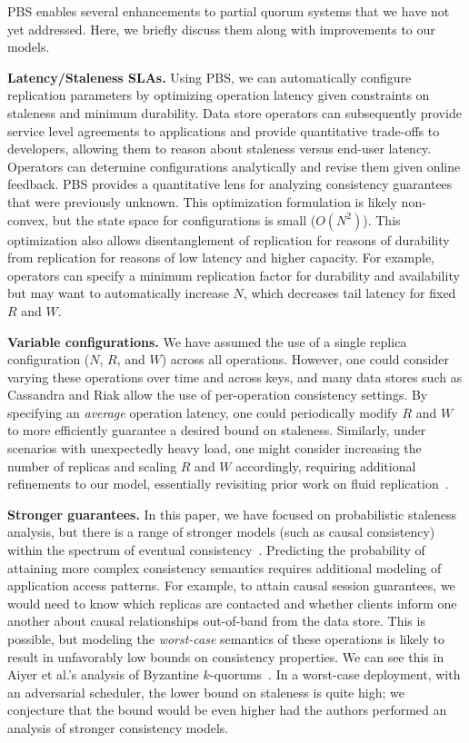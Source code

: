 \documentclass{vldb}
\begin{document}
PBS enables several enhancements to partial quorum systems that we
have not yet addressed.  Here, we briefly discuss them along with
improvements to our models.

\textbf{Latency/Staleness SLAs.} Using PBS, we can automatically
configure replication parameters by optimizing operation latency given
constraints on staleness and minimum durability.  Data store operators
can subsequently provide service level agreements to applications and
provide quantitative trade-offs to developers, allowing them to reason
about staleness versus end-user latency.  Operators can determine
configurations analytically and revise them given online feedback.
PBS provides a quantitative lens for analyzing consistency guarantees
that were previously unknown.  This optimization formulation is likely
non-convex, but the state space for configurations is small
($O(N^2)$).  This optimization also allows disentanglement of
replication for reasons of durability from replication for reasons of
low latency and higher capacity.  For example, operators can specify a
minimum replication factor for durability and availability but may
want to automatically increase $N$, which decreases tail latency for
fixed $R$ and $W$.

\textbf{Variable configurations.} We have assumed the use of a single
replica configuration ($N$, $R$, and $W$) across all operations.
However, one could consider varying these operations over time and
across keys, and many data stores such as Cassandra and Riak allow the use of
per-operation consistency settings.  By specifying an \textit{average}
operation latency, one could periodically modify $R$ and $W$ to more
efficiently guarantee a desired bound on staleness.  Similarly, under
scenarios with unexpectedly heavy load, one might consider increasing
the number of replicas and scaling $R$ and $W$ accordingly, requiring
additional refinements to our model, essentially revisiting prior work
on fluid replication~\cite{fluidreplication}.

\textbf{Stronger guarantees.} In this paper, we have focused on
probabilistic staleness analysis, but there is a range of stronger
models (such as causal consistency) within the spectrum of eventual
consistency~\cite{vogels-defs}.  Predicting the probability of
attaining more complex consistency semantics requires additional
modeling of application access patterns.  For example, to attain
causal session guarantees, we would need to know which replicas are
contacted and whether clients inform one another about causal
relationships out-of-band from the data store.  This is possible, but
modeling the \textit{worst-case} semantics of these operations is
likely to result in unfavorably low bounds on consistency properties.
We can see this in Aiyer et al.'s analysis of Byzantine
$k$-quorums~\cite{multi-k-quorum}.  In a worst-case deployment, with
an adversarial scheduler, the lower bound on staleness is quite high;
we conjecture that the bound would be even higher had the authors
performed an analysis of stronger consistency models.
\end{document}
